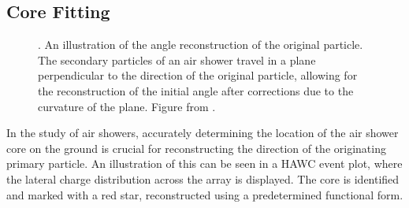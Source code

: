 \subsection{Core Fitting} \label{sec:hawc_core_fitting}

\begin{figure}[h!]
    \caption{. An illustration of the angle reconstruction of the original particle. The secondary particles of an air shower travel in a plane perpendicular to the direction of the original particle, allowing for the reconstruction of the initial angle after corrections due to the curvature of the plane. Figure from \cite{thesis_Zigg}.}
    \label{fig:shower_shape}
\end{figure}

In the study of air showers, accurately determining the location of the air shower core on the ground is crucial for reconstructing the direction of the originating primary particle. An illustration of this can be seen in a HAWC event plot, where the lateral charge distribution across the array is displayed. The core is identified and marked with a red star, reconstructed using a predetermined functional form.

